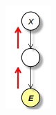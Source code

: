 \begin{figure}[!ht]
\begin{subfigure}[b]{0.14\textwidth}
        \includegraphics[width=\textwidth]{./img/Reti/Diagnostica.png}

\end{subfigure}
\end{figure}

